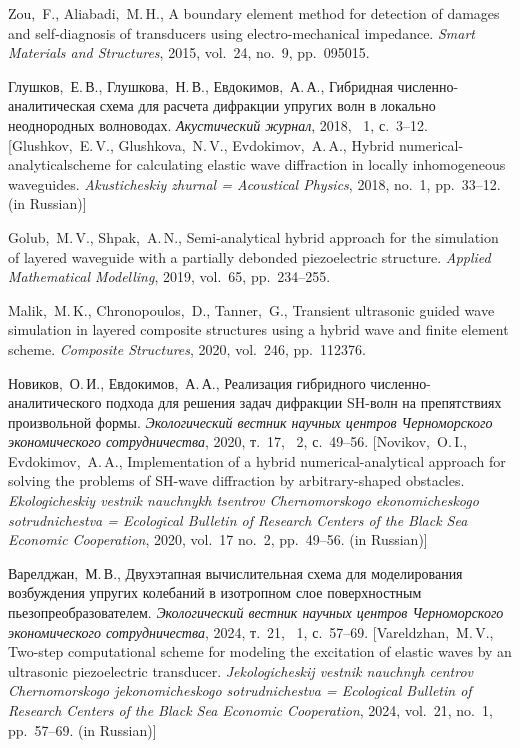 \documentclass[press]{vestnik}
\begin{document}
\begin{thebibliography}{23}
Zou,~F., Aliabadi,~M.\,H., A boundary element method for detection of damages and self-diagnosis of transducers using electro-mechanical impedance. \emph{Smart Materials and Structures}, 2015, vol.~24, no.~9, pp.~095015. 

Глушков,~Е.\,В., Глушкова,~Н.\,В., Евдокимов,~А.\,А., Гибридная численно-аналитическая схема для расчета дифракции упругих волн в локально неоднородных волноводах. \emph{Акустический журнал}, 2018, \No~1, с.~3--12. [Glushkov,~E.\,V., Glushkova,~N.\,V., Evdokimov,~A.\,A., Hybrid numerical-analyticalscheme for calculating elastic wave diffraction in locally inhomogeneous waveguides. \emph{Akusticheskiy zhurnal = Acoustical Physics}, 2018, no.~1, pp.~33--12. (in Russian)] 

Golub,~M.\,V., Shpak,~A.\,N., Semi-analytical hybrid approach for the simulation of layered waveguide with a partially debonded piezoelectric structure. \emph{Applied Mathematical Modelling}, 2019, vol.~65, pp.~234--255. 

Malik,~M.\,K., Chronopoulos,~D., Tanner,~G., Transient ultrasonic guided wave simulation in layered composite structures using a hybrid wave and finite element scheme. \emph{Composite Structures}, 2020, vol.~246, pp.~112376. 

Новиков,~О.\,И., Евдокимов,~А.\,А., Реализация гибридного численно-аналитического подхода для решения задач дифракции SH-волн на препятствиях произвольной формы. \emph{Экологический вестник научных центров Черноморского экономического сотрудничества}, 2020, т.~17, \No~2, с.~49--56. [Novikov,~O.\,I., Evdokimov,~A.\,A., Implementation of a hybrid numerical-analytical approach for solving the problems of SH-wave diffraction by arbitrary-shaped obstacles. \emph{Ekologicheskiy vestnik nauchnykh tsentrov Chernomorskogo ekonomicheskogo sotrudnichestva = Ecological Bulletin of Research Centers of the Black Sea Economic Cooperation}, 2020, vol.~17 no.~2, pp.~49--56. (in Russian)] 

Варелджан,~М.\,В., Двухэтапная вычислительная схема для моделирования возбуждения упругих колебаний в изотропном слое поверхностным пьезопреобразователем. \emph{Экологический вестник научных центров Черноморского экономического сотрудничества}, 2024, т.~21, \No~1, с.~57--69. [Vareldzhan,~M.\,V., Two-step computational scheme for modeling the excitation of elastic waves by an ultrasonic piezoelectric transducer. \emph{Jekologicheskij vestnik nauchnyh centrov Chernomorskogo jekonomicheskogo sotrudnichestva = Ecological Bulletin of Research Centers of the Black Sea Economic Cooperation}, 2024, vol.~21, no.~1, pp.~57--69. (in Russian)] 


\end{thebibliography}
\end{document}
